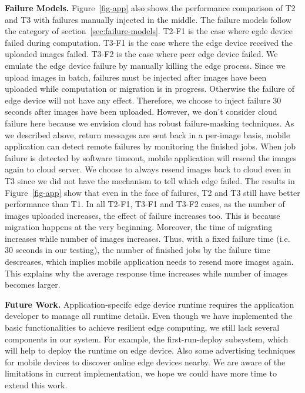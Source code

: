 \hfill\break
\noindent \textbf{Failure Models.}
Figure~\ref{fig-app} also shows the performance comparison of T2 and T3 with failures manually injected in the middle.
The failure models follow the category of section~\ref{sec:failure-models}. T2-F1 is the case where egde device failed
during computation. T3-F1 is the case where the edge device received the uploaded images failed. T3-F2 is the case where
peer edge device failed. We emulate the edge device failure by manually killing the edge process.
Since we upload images in batch, failures must be injected after images have been uploaded while computation or migration is in progress.
Otherwise the failure of edge device will not have any effect.
Therefore, we choose to inject failure 30 seconds after images have been uploaded.
However, we don't consider cloud failure here because we envision cloud has robust failure-masking techniques.
As we described above, return messages are sent back in a per-image basis, mobile application can detect remote failures by monitoring the finished jobs.
When job failure is detected by software timeout, mobile application will resend the images again to cloud server. We choose to always resend images
back to cloud even in T3 since we did not have the mechanism to tell which edge failed.
The results in Figure~\ref{fig-app} show that even in the face of failures, T2 and T3 still have better performance than T1.
In all T2-F1, T3-F1 and T3-F2 cases, as the number of images uploaded increases,
the effect of failure increases too. This is because migration happens at the very beginning. Moreover, the time of migrating increases while number of images increases.
Thus, with a fixed failure time (i.e. 30 seconds in our testing), the number of finished jobs by the failure time descreases, which implies mobile application needs to resend more images again. This explains why the average response time increases while number of images becomes larger.

\hfill\break
\noindent \textbf{Future Work.}
Application-specifc edge device runtime requires the application developer to manage all runtime details.
Even though we have implemented the basic functionalities to achieve resilient edge computing, we still
lack several components in our system. For example, the first-run-deploy subsystem, which will help
to deploy the runtime on edge device. Also some advertising techniques for mobile devices to discover
online edge devices nearby. We are aware of the limitations in current implementation, we hope we could have
more time to extend this work.
